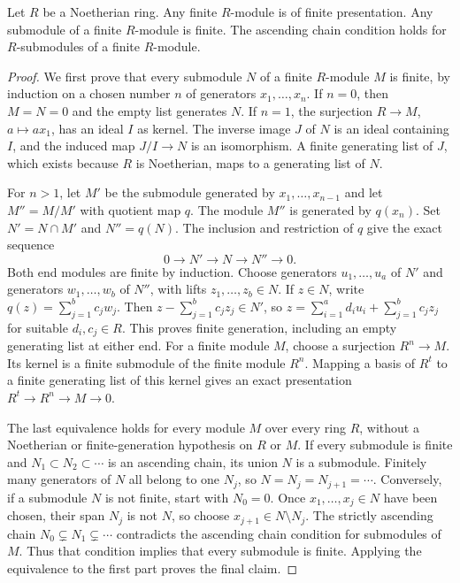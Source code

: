 \begin{lemma}
\label{lemma-Noetherian-basic}
Let $R$ be a Noetherian ring.
Any finite $R$-module is of finite presentation.
Any submodule of a finite $R$-module is finite.
The ascending chain condition holds for $R$-submodules
of a finite $R$-module.
\end{lemma}

\begin{proof}
We first prove that every submodule $N$ of a finite $R$-module
$M$ is finite, by induction on a chosen number $n$ of generators
$x_1,\ldots,x_n$. If $n=0$, then $M=N=0$ and the empty list
generates $N$. If $n=1$, the surjection $R\to M$, $a\mapsto ax_1$,
has an ideal $I$ as kernel. The inverse image $J$ of $N$ is an
ideal containing $I$, and the induced map $J/I\to N$ is an
isomorphism. A finite generating list of $J$, which exists because
$R$ is Noetherian, maps to a generating list of $N$.

For $n>1$, let $M'$ be the submodule generated by
$x_1,\ldots,x_{n-1}$ and let $M''=M/M'$ with quotient map $q$.
The module $M''$ is generated by $q(x_n)$.
Set $N'=N\cap M'$ and $N''=q(N)$. The inclusion and restriction
of $q$ give the exact sequence
$$
0\longrightarrow N'\longrightarrow N\longrightarrow N''
\longrightarrow0.
$$
Both end modules are finite by induction. Choose generators
$u_1,\ldots,u_a$ of $N'$ and generators
$w_1,\ldots,w_b$ of $N''$, with lifts
$z_1,\ldots,z_b\in N$. If $z\in N$, write
$q(z)=\sum_{j=1}^b c_jw_j$. Then
$z-\sum_{j=1}^b c_jz_j\in N'$, so
$z=\sum_{i=1}^a d_i u_i+\sum_{j=1}^b c_jz_j$ for suitable
$d_i,c_j\in R$. This proves finite generation, including an
empty generating list at either end.
For a finite module $M$, choose a surjection $R^n\to M$.
Its kernel is a finite submodule of the finite module $R^n$.
Mapping a basis of $R^t$ to a finite generating list of this
kernel gives an exact presentation $R^t\to R^n\to M\to0$.

The last equivalence holds for every module $M$ over every ring
$R$, without a Noetherian or finite-generation hypothesis on
$R$ or $M$. If every submodule is finite and
$N_1\subset N_2\subset\cdots$ is an ascending chain,
its union $N$ is a submodule. Finitely many generators of $N$
all belong to one $N_j$, so $N=N_j=N_{j+1}=\cdots$.
Conversely, if a submodule $N$ is not finite, start with
$N_0=0$. Once $x_1,\ldots,x_j\in N$ have been chosen, their
span $N_j$ is not $N$, so choose $x_{j+1}\in N\setminus N_j$.
The strictly ascending chain $N_0\subsetneq N_1\subsetneq\cdots$
contradicts the ascending chain condition for submodules of $M$.
Thus that condition implies that every submodule is finite.
Applying the equivalence to the first part proves the final claim.
\end{proof}